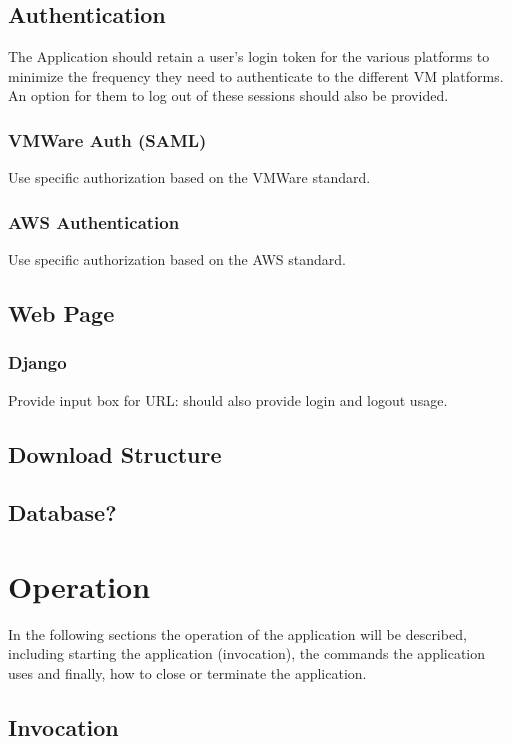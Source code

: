 \documentclass{article}
\begin{document}
        \subsection{Authentication}
        The Application should retain a user's login token for the various platforms to minimize the frequency they need to authenticate to the different VM platforms.
        An option for them to log out of these sessions should also be provided.

            \subsubsection{VMWare Auth (SAML)}
            Use specific authorization based on the VMWare standard.

            \subsubsection{AWS Authentication}
            Use specific authorization based on the AWS standard.

        \subsection{Web Page}
            \subsubsection{Django}
            Provide input box for URL: should also provide login and logout usage.

        \subsection{Download Structure}

        \subsection{Database?}

    \section{Operation}
    In the following sections the operation of the application will be described, including starting the application
    (invocation), the commands the application uses and finally, how to close or terminate the application.

        \subsection{Invocation}
\end{document}
